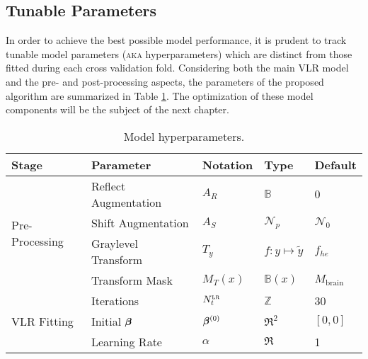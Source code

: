 \subsection{Tunable Parameters}
In order to achieve the best possible model performance, it is prudent to track tunable model parameters (\textsc{aka} hyperparameters) which are distinct from those fitted during each cross validation fold. Considering both the main VLR model and the pre- and post-processing aspects, the parameters of the proposed algorithm are summarized in Table \ref{tab:hyperparams}. The optimization of these model components will be the subject of the next chapter. 
\begin{table}
  \centering
  \caption{Model hyperparameters.}
  \label{tab:hyperparams}
  \begin{tabular}{lllll}
    \hline
    Stage                            & Parameter            & Notation                    & Type                                          & Default                   \\ \hline
    \multirow{4}{*}{Pre-Processing}  & Reflect Augmentation & $A_R$                       & $\mathbb{B}$                                  & 0                         \\
                                     & Shift Augmentation   & $A_S$                       & $\mathcal{N}_p$                                        & $\mathcal{N}_0$                    \\
                                     & Graylevel Transform  & $T_y$                       & $f: y\mapsto \tilde{y}$                       & $f_{he}$                  \\
                                     & Transform Mask       & $M_{T}(x)$                  & $\mathbb{B}(x)$                               & $M_{\text{brain}}$        \\ \hline
    \multirow{6}{*}{VLR Fitting}     & Iterations           & $N_{t}^{\textsc{lr}}$               & $\mathbb{Z}$                                  & 30                        \\
                                     & Initial $\bm{\beta}$        & $\bm{\beta}^{(0)}$                 & $\Re^2$                                       & $[0,0]$                   \\
                                     & Learning Rate        & $\alpha$                    & $\Re$                                         & 1                         \\

\end{tabular}
\end{table}
